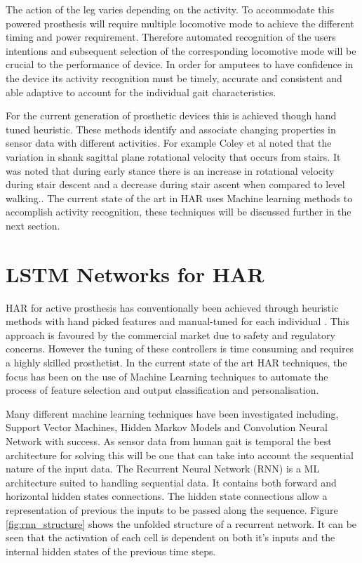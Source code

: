 \documentclass[sensors,article,submit,moreauthors,pdftex]{Definitions/mdpi}
\begin{document}
The action of the leg varies depending on the activity. To accommodate this powered prosthesis will require multiple locomotive mode to achieve the different timing and power requirement. Therefore automated recognition of the users intentions and subsequent selection of the corresponding locomotive mode will be crucial to the performance of device.\cite{Tucker2015, Windrich2016, Zhang2015} In order for amputees to have confidence in the device its activity recognition must be timely, accurate and consistent and able adaptive to account for the individual gait characteristics.\cite{Pedroli2019, Sinha2011, Ponce2016}

For the current generation of prosthetic devices this is achieved though hand tuned heuristic. These methods identify and associate changing properties in sensor data with different activities. For example Coley et al noted that the variation in shank sagittal plane rotational velocity that occurs from stairs. It was noted that during early stance there is an increase in rotational velocity during stair descent and a decrease during stair ascent when compared to level walking.\cite{Coley2005}. The current state of the art in HAR uses Machine learning methods to accomplish activity recognition, these techniques will be discussed further in the next section.




\section{LSTM Networks for HAR} 
\label{sec:lstm_therory}
HAR for active prosthesis has conventionally been achieved through heuristic methods with hand picked features and manual-tuned for each individual \cite{Maqbool2017, Xu2018}. This approach is favoured by the commercial market due to safety and regulatory concerns\cite{Fluit2020}. However the tuning of these controllers is time consuming and requires a highly skilled prosthetist. In the current state of the art HAR techniques, the focus has been on the use of Machine Learning techniques to automate the process of feature selection and output classification and personalisation\cite{Labarriere2020}.

Many different machine learning techniques have been investigated including, Support Vector Machines, Hidden Markov Models and Convolution Neural Network with success\cite{Labarriere2020}. As sensor data from human gait is temporal the best architecture for solving this will be one that can take into account the sequential nature of the input data. The Recurrent Neural Network (RNN) is a ML architecture suited to handling sequential data. It contains both forward and horizontal hidden states connections. The hidden state connections allow a representation of previous the inputs to be passed along the sequence. Figure \ref{fig:rnn_structure} shows the unfolded structure of a recurrent network. It can be seen that the activation of each cell is dependent on both it's inputs and the internal hidden states of the previous time steps.
\end{document}
